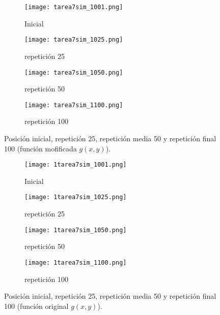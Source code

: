\documentclass{article}
\begin{document}
\begin{figure}
       \centering
       \begin{subfigure}[b]{0.48\linewidth}
           \texttt{[image: tarea7sim\_1001.png]}
           \caption{Inicial}
           \label{fig:westminster_lateral}
        \end{subfigure}
        \begin{subfigure}[b]{0.48\linewidth}
            \texttt{[image: tarea7sim\_1025.png]}
            \caption{repetici\'on 25}
            \label{fig:westminster_aerea}
        \end{subfigure}
        \begin{subfigure}[b]{0.48\linewidth}
            \texttt{[image: tarea7sim\_1050.png]}
            \caption{repetici\'on 50}
            \label{fig:westminster_aerea}
        \end{subfigure}
        \begin{subfigure}[b]{0.48\linewidth}
            \texttt{[image: tarea7sim\_1100.png]}
            \caption{repetici\'on 100}
            \label{fig:westminster_aerea}
        \end{subfigure}
        \caption{Posici\'on inicial, repetici\'on 25, repetici\'on media 50 y repetici\'on final 100 (funci\'on mofificada $g(x, y)$).}
        \label{fig:westminster}
\end{figure}

\begin{figure}
       \centering
       \begin{subfigure}[b]{0.48\linewidth}
           \texttt{[image: 1tarea7sim\_1001.png]}
           \caption{Inicial}
           \label{fig:westminster_lateral}
        \end{subfigure}
        \begin{subfigure}[b]{0.48\linewidth}
            \texttt{[image: 1tarea7sim\_1025.png]}
            \caption{repetici\'on 25}
            \label{fig:westminster_aerea}
        \end{subfigure}
        \begin{subfigure}[b]{0.48\linewidth}
            \texttt{[image: 1tarea7sim\_1050.png]}
            \caption{repetici\'on 50}
            \label{fig:westminster_aerea}
        \end{subfigure}
        \begin{subfigure}[b]{0.48\linewidth}
            \texttt{[image: 1tarea7sim\_1100.png]}
            \caption{repetici\'on 100}
            \label{fig:westminster_aerea}
        \end{subfigure}
        \caption{Posici\'on inicial, repetici\'on 25, repetici\'on media 50 y repetici\'on final 100 (funci\'on original $g(x, y)$).}
        \label{fig:westminster}
\end{figure}
\end{document}
